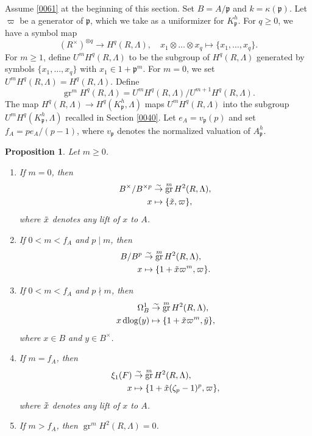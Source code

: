 \documentclass{amsart}
\newtheorem{Prop}[Thm]{Proposition}
\theoremstyle{remark}
\numberwithin{equation}{subsection}
\newcommand{\isomto}{\overset{\sim}{\to}}
\newcommand{\tensor}{\mathbin{\otimes}}
\newcommand{\ideal}[1]{\mathfrak{#1}}
\DeclareMathOperator{\gr}{gr}
\DeclareMathOperator{\dlog}{dlog}
\begin{document}
Assume \eqref{0061}
at the beginning of this section.
Set $B = A / \ideal{p}$ and $k = \kappa(\ideal{p})$.
Let $\varpi$ be a generator of $\ideal{p}$,
which we take as a uniformizer for $K_{\ideal{p}}^{h}$.
For $q \ge 0$,
we have a symbol map
	\[
			(R^{\times})^{\tensor q}
		\to
			H^{q}(R, \Lambda),
		\quad
			x_{1} \tensor \dots \tensor x_{q}
		\mapsto
			\{x_{1}, \dots, x_{q}\}.
	\]
For $m \ge 1$, define $U^{m} H^{q}(R, \Lambda)$
to be the subgroup of $H^{q}(R, \Lambda)$
generated by symbols $\{x_{1}, \dots, x_{q}\}$
with $x_{1} \in 1 + \ideal{p}^{m}$.
For $m = 0$, we set $U^{m} H^{q}(R, \Lambda) = H^{q}(R, \Lambda)$.
Define
	\[
			\gr^{m} H^{q}(R, \Lambda)
		=
				U^{m} H^{q}(R, \Lambda)
			/
				U^{m + 1} H^{q}(R, \Lambda).
	\]
The map $H^{q}(R, \Lambda) \to H^{q}(K_{\ideal{p}}^{h}, \Lambda)$
maps $U^{m} H^{q}(R, \Lambda)$ into the subgroup
$U^{m} H^{q}(K_{\ideal{p}}^{h}, \Lambda)$
recalled in Section \ref{0040}.
Let $e_{A} = v_{\ideal{p}}(p)$
and set $f_{A} = p e_{A} / (p - 1)$,
where $v_{\ideal{p}}$ denotes the normalized valuation of $A_{\ideal{p}}^{h}$.

\begin{Prop} \label{0069}
	Let $m \ge 0$.
	\begin{enumerate}
		\item \label{0207}
			If $m = 0$, then
				\begin{align*}
							B^{\times} / B^{\times p}
					&	\isomto
							\gr^{m} H^{2}(R, \Lambda),
					\\
							x
					&	\mapsto
							\{\Tilde{x}, \varpi\},
				\end{align*}
			where $\Tilde{x}$ denotes any lift of $x$ to $A$.
		\item \label{0208}
			If $0 < m < f_{A}$ and $p \mid m$, then
				\begin{align*}
							B / B^{p}
					&	\isomto
							\gr^{m} H^{2}(R, \Lambda),
					\\
							x
					&	\mapsto
							\{1 + \Tilde{x} \varpi^{m}, \varpi\}.
				\end{align*}
		\item \label{0209}
			If $0 < m < f_{A}$ and $p \nmid m$, then
				\begin{align*}
							\Omega_{B}^{1}
					&	\isomto
							\gr^{m} H^{2}(R, \Lambda),
					\\
							x \dlog(y)
					&	\mapsto
							\{1 + \Tilde{x} \varpi^{m}, \Tilde{y}\},
				\end{align*}
			where $x \in B$ and $y \in B^{\times}$.
		\item \label{0210}
			If $m = f_{A}$, then
				\begin{align*}
							\xi_{1}(F)
					&	\isomto
							\gr^{m} H^{2}(R, \Lambda),
					\\
							x
					&	\mapsto
							\{1 + \Tilde{x} (\zeta_{p} - 1)^{p}, \varpi\},
				\end{align*}
			where $\Tilde{x}$ denotes any lift of $x$ to $A$.
		\item \label{0211}
			If $m > f_{A}$, then $\gr^{m} H^{2}(R, \Lambda) = 0$.
	\end{enumerate}
\end{Prop}
\end{document}
